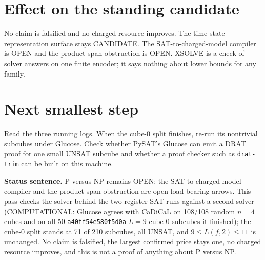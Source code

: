 \documentclass[11pt]{article}
\begin{document}
\section*{Effect on the standing candidate}
No claim is falsified and no charged resource improves. The time-state-representation surface stays CANDIDATE. The SAT-to-charged-model compiler is OPEN and the product-span obstruction is OPEN. XSOLVE is a check of solver answers on one finite encoder; it says nothing about lower bounds for any family.

\section*{Next smallest step}
Read the three running logs. When the cube-0 split finishes, re-run its nontrivial subcubes under Glucose. Check whether PySAT's Glucose can emit a DRAT proof for one small UNSAT subcube and whether a proof checker such as \texttt{drat-trim} can be built on this machine.

\bigskip
\noindent\textbf{Status sentence.} P versus NP remains OPEN: the SAT-to-charged-model compiler and the product-span obstruction are open load-bearing arrows. This pass checks the solver behind the two-register SAT runs against a second solver (COMPUTATIONAL: Glucose agrees with CaDiCaL on 108/108 random $n=4$ cubes and on all 50 \texttt{a40ff54e580f5d0a} $L=9$ cube-0 subcubes it finished); the cube-0 split stands at 71 of 210 subcubes, all UNSAT, and $9\le L(f,2)\le 11$ is unchanged. No claim is falsified, the largest confirmed price stays one, no charged resource improves, and this is not a proof of anything about P versus NP.
\end{document}
